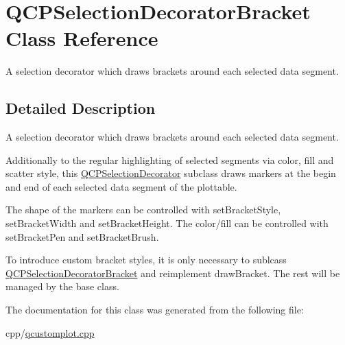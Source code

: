 \hypertarget{class_q_c_p_selection_decorator_bracket}{}\section{Q\+C\+P\+Selection\+Decorator\+Bracket Class Reference}
\label{class_q_c_p_selection_decorator_bracket}


A selection decorator which draws brackets around each selected data segment.  




\subsection{Detailed Description}
A selection decorator which draws brackets around each selected data segment. 

Additionally to the regular highlighting of selected segments via color, fill and scatter style, this \mbox{\hyperlink{class_q_c_p_selection_decorator}{Q\+C\+P\+Selection\+Decorator}} subclass draws markers at the begin and end of each selected data segment of the plottable.

The shape of the markers can be controlled with set\+Bracket\+Style, set\+Bracket\+Width and set\+Bracket\+Height. The color/fill can be controlled with set\+Bracket\+Pen and set\+Bracket\+Brush.

To introduce custom bracket styles, it is only necessary to sublcass \mbox{\hyperlink{class_q_c_p_selection_decorator_bracket}{Q\+C\+P\+Selection\+Decorator\+Bracket}} and reimplement draw\+Bracket. The rest will be managed by the base class. 

The documentation for this class was generated from the following file\+:\begin{DoxyCompactItemize}
\item 
cpp/\mbox{\hyperlink{qcustomplot_8cpp}{qcustomplot.\+cpp}}\end{DoxyCompactItemize}
